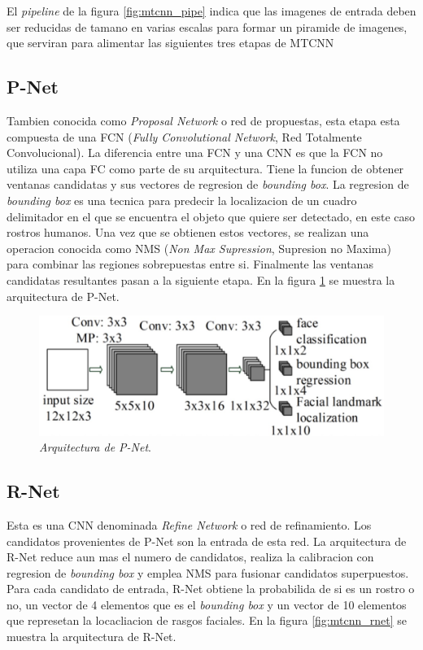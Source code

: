El \textit{pipeline} de la figura \ref{fig:mtcnn_pipe} indica que las imagenes de entrada deben ser reducidas de tamano en varias escalas para formar un piramide de imagenes, que serviran para alimentar las siguientes tres etapas de MTCNN

\subsection{P-Net}
Tambien conocida como \textit{Proposal Network} o red de propuestas, esta etapa esta compuesta de una FCN (\textit{Fully Convolutional Network}, Red Totalmente Convolucional). La diferencia entre una FCN y una CNN es que la FCN no utiliza una capa FC como parte de su arquitectura. Tiene la funcion de obtener ventanas candidatas y sus vectores de regresion de \textit{bounding box}. La regresion de \textit{bounding box} es una tecnica para predecir la localizacion de un cuadro delimitador en el que se encuentra el objeto que quiere ser detectado, en este caso rostros humanos. Una vez que se obtienen estos vectores, se realizan una operacion conocida como NMS (\textit{Non Max Supression}, Supresion no Maxima) para combinar las regiones sobrepuestas entre si. Finalmente las ventanas candidatas resultantes pasan a la siguiente etapa. En la figura \ref{fig:mtcnn_pnet} se muestra la arquitectura de P-Net.

\begin{figure}[h]
	\centering
	\includegraphics[scale=0.25]{./Figures/mtcnn_pnet.png}
	\caption{\textit{Arquitectura de P-Net}.}
	\label{fig:mtcnn_pnet}
\end{figure}
	
\subsection{R-Net}
Esta es una CNN denominada \textit{Refine Network} o red de refinamiento. Los candidatos provenientes de P-Net son la entrada de esta red. La arquitectura de R-Net reduce aun mas el numero de candidatos, realiza la calibracion con regresion de \textit{bounding box} y emplea NMS para fusionar candidatos superpuestos. Para cada candidato de entrada, R-Net obtiene la probabilida de si es un rostro o no, un vector de 4 elementos que es el \textit{bounding box} y un vector de 10 elementos que represetan la locacliacion de rasgos faciales. En la figura \ref{fig:mtcnn_rnet} se muestra la arquitectura de R-Net.

